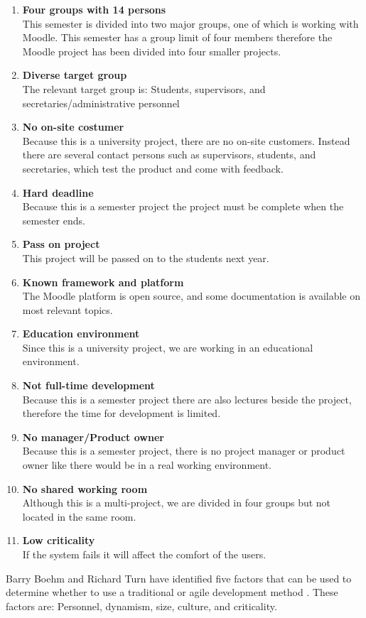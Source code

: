 \begin{enumerate}
	\item \textbf{Four groups with 14 persons} \label{enum:groupSize}\\
	This semester is divided into two major groups, one of which is working with Moodle. 
	This semester has a group limit of four members therefore the Moodle project has been divided into four smaller projects.
	\item \textbf{Diverse target group} \label{enum:targetGroup}\\ 
	The relevant target group is: Students, supervisors, and secretaries/administrative personnel 
	\item \textbf{No on-site costumer} \label{enum:onsite}\\
	Because this is a university project, there are no on-site customers. 
	Instead there are several contact persons such as supervisors, students, and secretaries, which test the product and come with feedback.
	\item \textbf{Hard deadline} \label{enum:deadline}\\
	Because this is a semester project the project must be complete when the semester ends.
	\item \textbf{Pass on project} \label{enum:passed}\\
	This project will be passed on to the students next year.
	\item \textbf{Known framework and platform} \label{enum:framework}\\
	The Moodle platform is open source, and some documentation is available on most relevant topics.
	\item \textbf{Education environment} \label{enum:education}\\
	Since this is a university project, we are working in an educational environment.
	\item \textbf{Not full-time development} \label{enum:halftime}\\
	Because this is a semester project there are also lectures beside the project, therefore the time for development is limited. 
	\item \textbf{No manager/Product owner} \label{enum:manager}\\
	Because this is a semester project, there is no project manager or product owner like there would be in a real working environment.
	\item \textbf{No shared working room} \label{enum:room}\\
	Although this is a multi-project, we are divided in four groups but not located in the same room.
	\item \textbf{Low criticality} \label{enum:criticality}\\
	If the system fails it will affect the comfort of the users.
\end{enumerate}
Barry Boehm and Richard Turn have identified five factors that can be used to determine whether to use a traditional or agile development method \citep{boehmTurner}.
These factors are: Personnel, dynamism, size, culture, and criticality.

